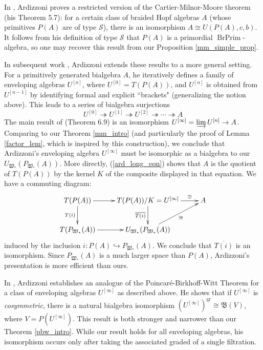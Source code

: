 \documentclass[12pt]{article}
\DeclareMathOperator{\BrPrim}{BrPrim}
\DeclareMathOperator{\gr}{gr}
\newcommand{\mB}{\mathfrak{B}}
\newcommand{\mW}{\mathfrak{W}}
\newcommand{\beqn}{\begin{equation}}
\newcommand{\eeqn}{\end{equation}}
\theoremstyle{plain}
\theoremstyle{definition}
\theoremstyle{remark}
\begin{document}
In \cite{ardizzoni_prim_gen}, Ardizzoni proves a restricted version of the Cartier-Milnor-Moore theorem (his Theorem 5.7): for a certain class of braided Hopf algebras $A$ (whose primitives $P(A)$ are of type $\mathcal{S}$), there is an isomorphism $A \cong U(P(A), c, b)$.  It follows from his definition of type $\mathcal{S}$ that $P(A)$ is a primordial $\BrPrim$-algebra, so one may recover this result from our Proposition \ref{mm_simple_prop}. 

In subsequent work \cite{ardizzoni_mm}, Ardizzoni extends these results to a more general setting.  For a primitively generated bialgebra $A$, he iteratively defines a family of enveloping algebras $U^{[n]}$, where $U^{[0]} = T(P(A))$, and $U^{[n]}$ is obtained from $U^{[n-1]}$ by identifying formal and explicit ``brackets" (generalizing the notion above).  This leads to a series of bialgebra surjections
%
\beqn \label{ard_long_eqn} U^{[0]} \twoheadrightarrow U^{[1]} \twoheadrightarrow U^{[2]} \twoheadrightarrow \cdots \twoheadrightarrow A\eeqn
%
The main result of \cite{ardizzoni_mm} (Theorem 6.9) is an isomorphism $U^{[\infty]} = \varinjlim U^{[n]} \to A$.  Comparing to our Theorem \ref{mm_intro} (and particularly the proof of Lemma \ref{factor_lem}, which is inspired by this construction), we conclude that Ardizzoni's enveloping algebra $U^{[\infty]}$ must be isomorphic as a bialgebra to our $U_{\mW_*}(P_{\mW_*}(A))$.  More directly, (\ref{ard_long_eqn}) shows that $A$ is the quotient of $T(P(A))$ by the kernel $K$ of the composite displayed in that equation.  We have a commuting diagram:
%
$$\xymatrix{
T(P(A)) \ar[d]_-{T(i)} \ar[r] & T(P(A))/K = U^{[\infty]} \ar[d]_-{\overline{T(i)}} \ar[r]^-{\cong} & A \\
T(P_{\mW_*}(A)) \ar[r] & U_{\mW_*}(P_{\mW_*}(A)) \ar[ur]_-{\cong} &
}$$
%
induced by the inclusion $i: P(A) \hookrightarrow P_{\mW_*}(A)$.  We conclude that $\overline{T(i)}$ is an isomorphism.  Since $P_{\mW_*}(A)$ is a much larger space than $P(A)$, Ardizzoni's presentation is more efficient than ours.

In \cite{ardizzoni_glasgow}, Ardizzoni establishes an analogue of the Poincar\'e-Birkhoff-Witt Theorem for a class of enveloping algebras $U^{[\infty]}$ as described above.  He shows that if $U^{[\infty]}$ is \emph{cosymmetric}, there is a natural bialgebra isomorphism $(U^{[\infty]})^{\gr} \cong \mB(V)$, where $V = P(U^{[\infty]})$.  This result is both stronger and narrower than our Theorem \ref{pbw_intro}.  While our result holds for all enveloping algebras, his isomorphism occurs only after taking the associated graded of a single filtration.


\end{document}
